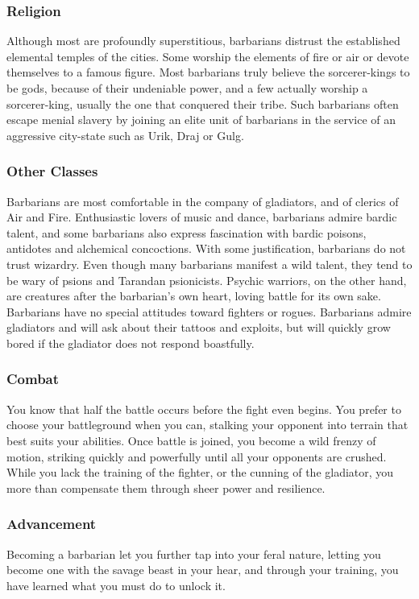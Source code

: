 \subsubsection{Religion}
Although most are profoundly superstitious, barbarians distrust the established elemental temples of the cities. Some worship the elements of fire or air or devote themselves to a famous figure. Most barbarians truly believe the sorcerer-kings to be gods, because of their undeniable power, and a few actually worship a sorcerer-king, usually the one that conquered their tribe. Such barbarians often escape menial slavery by joining an elite unit of barbarians in the service of an aggressive city-state such as Urik, Draj or Gulg.

\subsubsection{Other Classes}
Barbarians are most comfortable in the company of gladiators, and of clerics of Air and Fire. Enthusiastic lovers of music and dance, barbarians admire bardic talent, and some barbarians also express fascination with bardic poisons, antidotes and alchemical concoctions. With some justification, barbarians do not trust wizardry. Even though many barbarians manifest a wild talent, they tend to be wary of psions and Tarandan psionicists. Psychic warriors, on the other hand, are creatures after the barbarian's own heart, loving battle for its own sake. Barbarians have no special attitudes toward fighters or rogues. Barbarians admire gladiators and will ask about their tattoos and exploits, but will quickly grow bored if the gladiator does not respond boastfully.

\subsubsection{Combat}
You know that half the battle occurs before the fight even begins. You prefer to choose your battleground when you can, stalking your opponent into terrain that best suits your abilities. Once battle is joined, you become a wild frenzy of motion, striking quickly and powerfully until all your opponents are crushed. While you lack the training of the fighter, or the cunning of the gladiator, you more than compensate them through sheer power and resilience.

\subsubsection{Advancement}
Becoming a barbarian let you further tap into your feral nature, letting you become one with the savage beast in your hear, and through your training, you have learned what you must do to unlock it.

